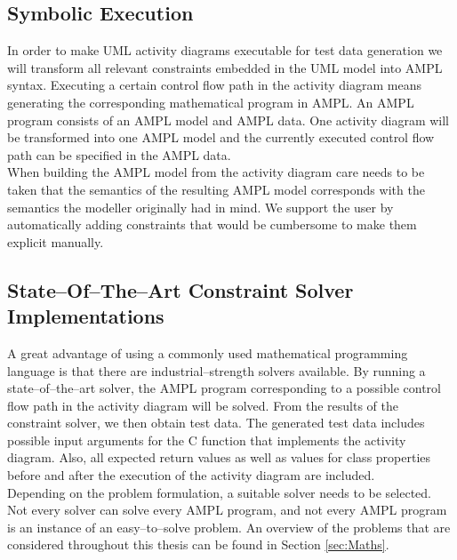 \subsection{Symbolic Execution}
In order to make UML activity diagrams executable for test data generation we will transform all relevant constraints embedded in the UML model into AMPL syntax. Executing a certain control flow path in the activity diagram means generating the corresponding mathematical program in AMPL. An AMPL program consists of an AMPL model and AMPL data. One activity diagram will be transformed into one AMPL model and the currently executed control flow path can be specified in the AMPL data.\\
When building the AMPL model from the activity diagram care needs to be taken that the semantics of the resulting AMPL model corresponds with the semantics the modeller originally had in mind. We support the user by automatically adding constraints that would be cumbersome to make them explicit manually.
\subsection{State--Of--The--Art Constraint Solver Implementations} 
A great advantage of using a commonly used mathematical programming language is that there are industrial--strength solvers available. By running a state--of--the--art solver, the AMPL program corresponding to a possible control flow path in the activity diagram will be solved. From the results of the constraint solver, we then obtain test data. The generated test data includes possible input arguments for the C function that implements the activity diagram. Also, all expected return values as well as values for class properties before and after the execution of the activity diagram are included.\\
Depending on the problem formulation, a suitable solver needs to be selected. Not every solver can solve every AMPL program, and not every AMPL program is an instance of an easy--to--solve problem. An overview of the problems that are considered throughout this thesis can be found in Section \ref{sec:Maths}.
